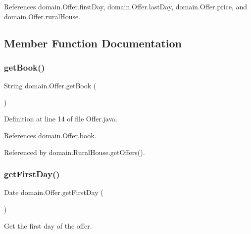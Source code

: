 References domain.\+Offer.\+first\+Day, domain.\+Offer.\+last\+Day, domain.\+Offer.\+price, and domain.\+Offer.\+rural\+House.



\subsection{Member Function Documentation}
\mbox{\label{classdomain_1_1Offer_afebfadadf66b46ce87a9777d01fc2a41}} 
\subsubsection{\texorpdfstring{getBook()}{getBook()}}
{\footnotesize\ttfamily String domain.\+Offer.\+get\+Book (\begin{DoxyParamCaption}{ }\end{DoxyParamCaption})}



Definition at line 14 of file Offer.\+java.


\begin{DoxyCode}{0}

\end{DoxyCode}


References domain.\+Offer.\+book.



Referenced by domain.\+Rural\+House.\+get\+Offers().

\mbox{\label{classdomain_1_1Offer_ae13ac55ba469cb34e004d6aff68430fb}} 
\subsubsection{\texorpdfstring{getFirstDay()}{getFirstDay()}}
{\footnotesize\ttfamily Date domain.\+Offer.\+get\+First\+Day (\begin{DoxyParamCaption}{ }\end{DoxyParamCaption})}



Get the first day of the offer. 

